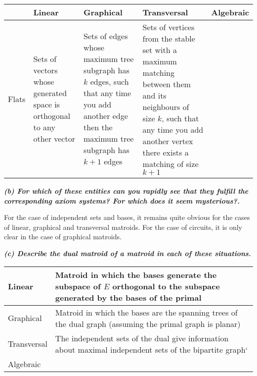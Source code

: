 \begin{tabularx}{\textwidth}{X|X|X|X|X|}
& Linear & Graphical & Transversal       & Algebraic   \\ \hline
Flats            & Sets of vectors whose generated space is orthogonal to any other vector & Sets of edges whose maximum tree subgraph has $k$ edges, such that any time you add another edge then the maximum tree subgraph has $k+1$ edges & Sets of vertices from the stable set with a maximum matching between them and its neighbours of size $k$, such that any time you add another vertex there exists a matching of size $k+1$& \\ \hline                                     
\end{tabularx}
\vspace{3pt}

\hspace{5pt}\textbf{\textit{(b) For which of these entities can you rapidly see that they fulfill the corresponding axiom systems?  For which does it seem mysterious?.}}

\vspace{3pt}

For the case of independent sets and bases, it remains quite obvious for the cases of linear, graphical and transversal matroids.
For the case of circuits, it is only clear in the case of graphical matroids.

\vspace{3pt}

\hspace{5pt}\textbf{\textit{(c) Describe the dual matroid of a matroid in each of these situations.}}

\vspace{3pt}

\begin{tabularx}{\textwidth}{X|X}
Linear & Matroid in which the bases generate the subspace of $E$ orthogonal to the subspace generated by the bases of the primal \\ \hline
Graphical & Matroid in which the bases are the spanning trees of the dual graph (assuming the primal graph is planar) \\ \hline
Transversal & The independent sets of the dual give information about maximal independent sets of the bipartite graph`\\ \hline
Algebraic & 
\end{tabularx}